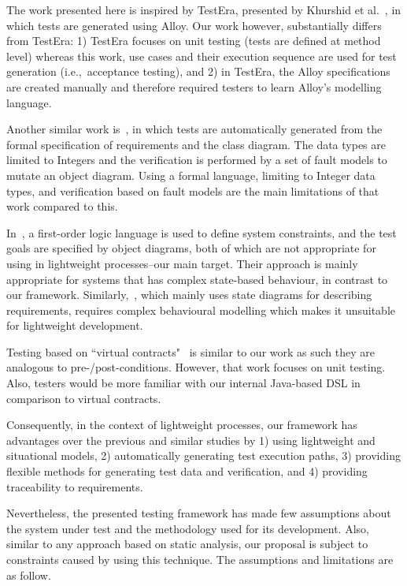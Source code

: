 %
%
\label{sec:discussion}
The work presented here is inspired by TestEra, presented by Khurshid et al.~\cite{Khurshid2004}, in which tests are generated using Alloy. Our work however, substantially differs from TestEra: 1) TestEra focuses on unit testing (tests are defined at method level) whereas this work, use cases and their execution sequence are used for test generation (i.e.,\ acceptance testing), and 2) in TestEra, the Alloy specifications are created manually and therefore required testers to learn Alloy's modelling language.

Another similar work is~\cite{Kaplan2008}, in which tests are automatically generated from the formal specification of requirements and the class diagram. The data types are limited to Integers and the verification is performed by a set of fault models to mutate an object diagram. Using a formal language, limiting to Integer data types, and verification based on fault models are the main limitations of that work compared to this.

In~\cite{Scheetz1999}, a first-order logic language is used to define system constraints, and the test goals are specified by object diagrams, both of which are not appropriate for using in lightweight processes--our main target. Their approach is mainly appropriate for systems that has complex state-based behaviour, in contrast to our framework.
Similarly,~\cite{Cavarra2002}, which mainly uses state diagrams for describing requirements, requires complex behavioural modelling which makes it unsuitable for lightweight development.

Testing based on ``virtual contracts"~\cite{Engels2006} is similar to our work as such they are analogous to pre-/post-conditions. However, that work focuses on unit testing. Also, testers would be more familiar with our internal Java-based DSL in comparison to virtual contracts.

Consequently, in the context of lightweight processes, our framework has advantages over the previous and similar studies by 1) using lightweight and situational models, 2) automatically generating test execution paths, 3) providing flexible methods for generating test data and verification, and 4) providing traceability to requirements.

Nevertheless, the presented testing framework has made few assumptions about the system under test and the methodology used for its development. Also, similar to any approach based on static analysis, our proposal is subject to constraints caused by using this technique. The assumptions and limitations are as follow.

